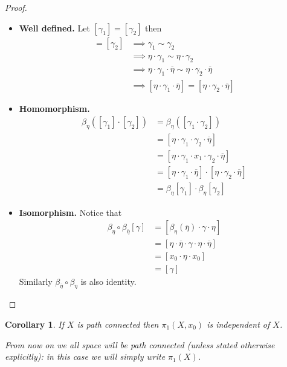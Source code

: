\documentclass[11pt,a4paper]{article}
\theoremstyle{definition}
\theoremstyle{plain}
\newtheorem{corollary}[definition]{Corollary}
\theoremstyle{remark}
\newcommand{\1}{\mathbbm{1}}
\begin{document}
\begin{proof}
    \begin{itemize}
        \item \textbf{Well defined.} Let $[\gamma_1] = [\gamma_2]$ then 
        \begin{align*}
            [\gamma_1] = [\gamma_2] &\implies \gamma_1 \sim \gamma_2 \\
            &\implies \eta \cdot \gamma_1 \sim \eta \cdot \gamma_2 \\
            &\implies \eta \cdot \gamma_1 \cdot \overline{\eta} \sim \eta \cdot \gamma_2 \cdot \overline{\eta} \\
            &\implies [\eta \cdot \gamma_1 \cdot \overline{\eta}] = [\eta \cdot \gamma_2 \cdot \overline{\eta}]
        \end{align*}
    
        \item \textbf{Homomorphism.} 
        \begin{align*}
            \beta_\eta \left([\gamma_1] \cdot [\gamma_2]\right) &= \beta_\eta \left([\gamma_1 \cdot \gamma_2]\right) \\
            &= [\eta \cdot \gamma_1 \cdot \gamma_2 \cdot \overline{\eta}] \\
            &= [\eta \cdot \gamma_1 \cdot x_1 \cdot \gamma_2 \cdot \overline{\eta}] \\
            &= [\eta \cdot \gamma_1 \cdot \overline{\eta}] \cdot [\eta \cdot \gamma_2 \cdot \overline{\eta}] \\
            &= \beta_\eta [\gamma_1] \cdot \beta_\eta [\gamma_2]
        \end{align*}

        \item \textbf{Isomorphism.} Notice that 
        \begin{align*}
            \beta_\eta \circ \beta_{\overline{\eta}} [\gamma] &= [\beta_\eta (\overline{\eta}) \cdot \gamma \cdot \eta] \\
            &= [\eta \cdot \overline{\eta} \cdot \gamma \cdot \eta \cdot \overline{\eta}] \\
            &= [x_0 \cdot \eta \cdot x_0] \\
            &= [\gamma]
        \end{align*}
        Similarly $\beta_{\overline{\eta}} \circ \beta_\eta$ is also identity.
    \end{itemize}
\end{proof}

\begin{corollary}
    If $X$ is path connected then $\pi_1(X, x_0)$ is independent of $X$.

    From now on we all space will be path connected (unless stated otherwise explicitly): in this case 
    we will simply write $\pi_1 (X)$.
\end{corollary}
\end{document}
